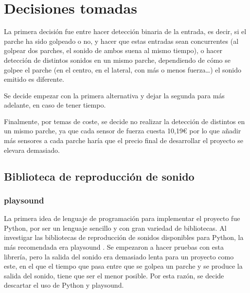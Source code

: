
    \section{Decisiones tomadas} %
    \label{sec:DecisionesTomadas}

        La primera decisión fue entre hacer detección binaria de la entrada, es decir, si el parche ha sido golpeado o
        no, y hacer que estas entradas sean concurrentes (al golpear dos parches, el sonido de ambos suena al mismo
        tiempo), o hacer detección de distintos sonidos en un mismo parche, dependiendo de cómo se golpee el parche (en
        el centro, en el lateral, con más o menos fuerza…) el sonido emitido es diferente.

        Se decide empezar con la primera alternativa y dejar la segunda para más adelante, en caso de tener tiempo.

        Finalmente, por temas de coste, se decide no realizar la detección de distintos en un mismo parche, ya que cada
        sensor de fuerza cuesta 10,19\euro{} por lo que añadir más sensores a cada parche haría que el precio final de
        desarrollar el proyecto se elevara demasiado.

        \subsection{Biblioteca de reproducción de sonido} %
        \label{sub:LibreriaDeReproduccionDeSonido}

            \subsubsection{playsound} %
            \label{ssub:Playsound}

                La primera idea de lenguaje de programación para implementar el proyecto fue Python, por ser un lenguaje
                sencillo y con gran variedad de bibliotecas. Al investigar las bibliotecas de reproducción de sonidos
                disponibles para Python, la más recomendada era playsound \cite{playsound}. Se empezaron a hacer pruebas
                con esta librería, pero la salida del sonido era demasiado lenta para un proyecto como este, en el que
                el tiempo que pasa entre que se golpea un parche y se produce la salida del sonido, tiene que ser el
                menor posible. Por esta razón, se decide descartar el uso de Python y playsound.


